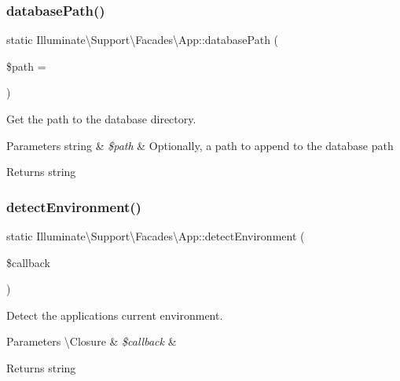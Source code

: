 \subsubsection{\texorpdfstring{database\+Path()}{databasePath()}}
{\footnotesize\ttfamily static Illuminate\textbackslash{}\+Support\textbackslash{}\+Facades\textbackslash{}\+App\+::database\+Path (\begin{DoxyParamCaption}\item[{}]{\$path = {\ttfamily \textquotesingle{}\textquotesingle{}} }\end{DoxyParamCaption})\hspace{0.3cm}{\ttfamily [static]}}

Get the path to the database directory.


\begin{DoxyParams}[1]{Parameters}
string & {\em \$path} & Optionally, a path to append to the database path \\
\hline
\end{DoxyParams}
\begin{DoxyReturn}{Returns}
string 
\end{DoxyReturn}
\mbox{\label{class_illuminate_1_1_support_1_1_facades_1_1_app_aeb4034f4059f16bcc57773dd9acfa0d8}} 
\subsubsection{\texorpdfstring{detect\+Environment()}{detectEnvironment()}}
{\footnotesize\ttfamily static Illuminate\textbackslash{}\+Support\textbackslash{}\+Facades\textbackslash{}\+App\+::detect\+Environment (\begin{DoxyParamCaption}\item[{}]{\$callback }\end{DoxyParamCaption})\hspace{0.3cm}{\ttfamily [static]}}

Detect the application\textquotesingle{}s current environment.


\begin{DoxyParams}[1]{Parameters}
\textbackslash{}\+Closure & {\em \$callback} & \\
\hline
\end{DoxyParams}
\begin{DoxyReturn}{Returns}
string 
\end{DoxyReturn}
\mbox{\label{class_illuminate_1_1_support_1_1_facades_1_1_app_a53c0fed127157d6e0bef9fbeb259f348}} 
